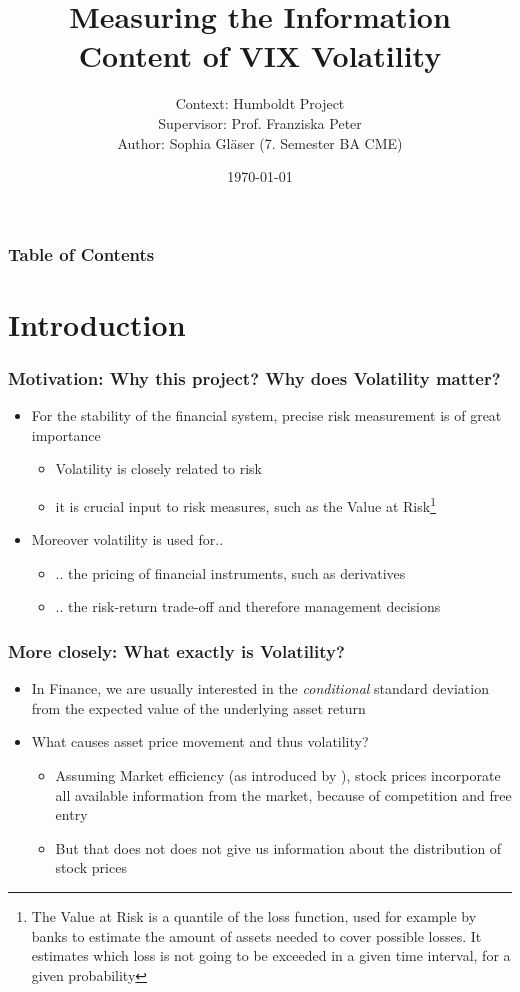 \documentclass[aspectratio=169]{beamer}
\title{Measuring the Information Content of VIX Volatility}
\author{Context: Humboldt Project\\
Supervisor: Prof. Franziska Peter\\
Author: Sophia Gläser (7. Semester BA CME)}
\date{\small \today}
\begin{document}
\begin{frame}
\maketitle
\end{frame}

\begin{frame}
\frametitle{Table of Contents}
\tableofcontents
\end{frame}

\section{Introduction}

\begin{frame}
\frametitle{Motivation: Why this project? Why does Volatility matter?}
	\begin{itemize}
	\item For the stability of the financial system, precise risk measurement is of great importance
	\begin{itemize}
	\item Volatility is closely related to risk 
	\item it is crucial input to risk measures, such as the Value at Risk\footnote{The Value at Risk is a quantile of the loss function, used for example by banks to estimate the amount of assets needed to cover possible losses. It estimates which loss is not going to be exceeded in a given time interval, for a given probability}
	\end{itemize}
	\item Moreover volatility is used for..
	\begin{itemize}
	\item .. the pricing of financial instruments, such as derivatives
	\item .. the risk-return trade-off and therefore management decisions
	\end{itemize}
	\end{itemize}
\end{frame}

\begin{frame}
\frametitle{More closely: What exactly is Volatility?}
	\begin{itemize}
	\item In Finance, we are usually interested in the \textit{conditional} standard deviation from the expected value of the underlying asset return \parencite{tsay2005}
	\item What causes asset price movement and thus volatility?
	\begin{itemize}
	\item Assuming Market efficiency (as introduced by \citeauthor{fama1970}), stock prices incorporate all available information from the market, because of competition and free entry 
	\item But that does not does not give us information about the distribution of stock prices
	\end{itemize}
	\end{itemize}
\end{frame}
\end{document}
